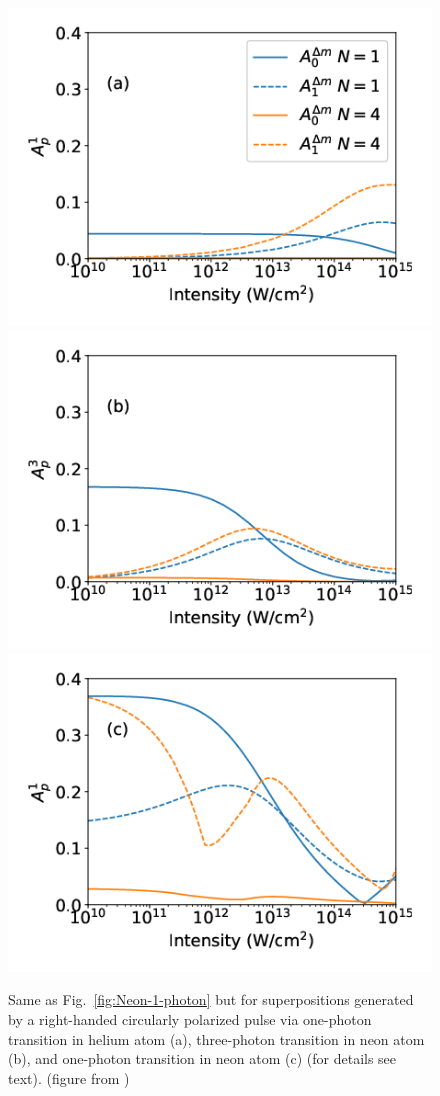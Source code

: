 \begin{figure}[!ht]
\centering
\includegraphics[width=0.32\linewidth]{figs/Photo_ionization/GAP/He_2p1.png}
\includegraphics[width=0.32\linewidth]{figs/Photo_ionization/GAP/Ne_2p-1_3d2_3p-combined.png}
\includegraphics[width=0.32\linewidth]{figs/Photo_ionization/GAP/Ne_2p-1_3d0_1p-combined.png}
\caption{
Same as Fig.~\ref{fig:Neon-1-photon} but for
superpositions generated by a right-handed circularly polarized pulse
via one-photon transition in helium atom (a),  
three-photon transition in neon atom (b), and 
one-photon transition in neon atom (c) (for details see text). (figure from \cite{venzke2020_GAP})
} 
  \label{fig:combined_data}
\end{figure}

